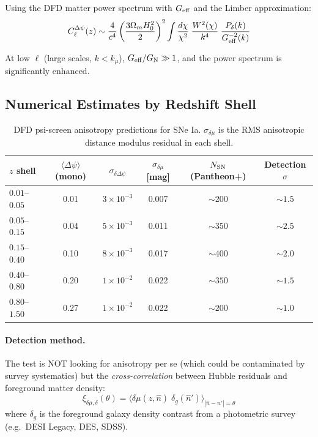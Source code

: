 \documentclass[11pt,a4paper]{article}
\newcounter{findingctr}
\newenvironment{finding}[1][]{%
  \refstepcounter{findingctr}%
  \begin{tcolorbox}[colback=blue!3!white, colframe=blue!50!black,
    title=\textbf{Finding \thefindingctr: #1}]
}{%
  \end{tcolorbox}%
}
\newcommand{\ee}[1]{\times 10^{#1}}
\newcommand{\GN}{G_{\rm N}}
\newcommand{\Omm}{\Omega_m}
\newcommand{\Geff}{G_{\rm eff}}
\newcommand{\kmu}{k_\mu}
\newcommand{\Dpsi}{\Delta\psi}
\begin{document}
\begin{finding}[\textbf{SNe Ia}: The Decisive Test --- Quantitative
  Predictions]
Using the DFD matter power spectrum with $\Geff$ and the Limber
approximation:
\begin{equation}
C_\ell^{\Dpsi}(z) \sim \frac{4}{c^4}
\left(\frac{3\Omm H_0^2}{2}\right)^2
\int \frac{d\chi}{\chi^2}\;
\frac{W^2(\chi)}{k^4}\;\frac{P_\delta(k)}{\Geff^{-2}(k)}
\end{equation}

At low $\ell$ (large scales, $k < \kmu$), $\Geff/\GN \gg 1$,
and the power spectrum is significantly enhanced.

\subsection*{Numerical Estimates by Redshift Shell}

\begin{table}[H]
\centering
\caption{DFD psi-screen anisotropy predictions for SNe Ia.
$\sigma_{\delta\mu}$ is the RMS anisotropic distance modulus
residual in each shell.}
\label{tab:sne-anisotropy}
\small
\begin{tabular}{lccccc}
\toprule
$z$ shell & $\langle\Dpsi\rangle$ (mono) &
$\sigma_{\delta\Dpsi}$ & $\sigma_{\delta\mu}$ [mag] &
$N_{\rm SN}$ (Pantheon+) & Detection $\sigma$ \\
\midrule
$0.01$--$0.05$ & 0.01 & $3\ee{-3}$ & 0.007 & $\sim 200$ &
  $\sim 1.5$ \\
$0.05$--$0.15$ & 0.04 & $5\ee{-3}$ & 0.011 & $\sim 350$ &
  $\sim 2.5$ \\
$0.15$--$0.40$ & 0.10 & $8\ee{-3}$ & 0.017 & $\sim 400$ &
  $\sim 2.0$ \\
$0.40$--$0.80$ & 0.20 & $1\ee{-2}$ & 0.022 & $\sim 350$ &
  $\sim 1.5$ \\
$0.80$--$1.50$ & 0.27 & $1\ee{-2}$ & 0.022 & $\sim 200$ &
  $\sim 1.0$ \\
\bottomrule
\end{tabular}
\end{table}

\paragraph{Detection method.} The test is NOT looking for anisotropy
per se (which could be contaminated by survey systematics) but
the \emph{cross-correlation} between Hubble residuals and foreground
matter density:
\begin{equation}
\xi_{\delta\mu,\delta}(\theta) = \langle \delta\mu(z,\hat n)\;
\delta_g(\hat n')\rangle_{|\hat n - \hat n'| = \theta}
\end{equation}
where $\delta_g$ is the foreground galaxy density contrast from
a photometric survey (e.g.\ DESI Legacy, DES, SDSS).


\end{finding}
\end{document}

